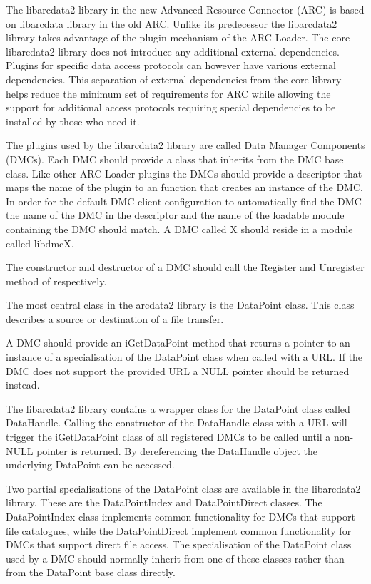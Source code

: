 \documentclass{book}
\begin{document}
The libarcdata2 library in the new Advanced Resource Connector (ARC)
is based on libarcdata library in the old ARC. Unlike its predecessor
the libarcdata2 library takes advantage of the plugin mechanism of the
ARC Loader. The core libarcdata2 library does not introduce any
additional external dependencies. Plugins for specific data access
protocols can however have various external dependencies. This
separation of external dependencies from the core library helps reduce
the minimum set of requirements for ARC while allowing the support for
additional access protocols requiring special dependencies to be
installed by those who need it.

The plugins used by the libarcdata2 library are called Data Manager
Components (DMCs). Each DMC should provide a class that inherits from
the DMC base class. Like other ARC Loader plugins the DMCs should
provide a descriptor that maps the name of the plugin to an function
that creates an instance of the DMC. In order for the default DMC
client configuration to automatically find the DMC the name of the DMC
in the descriptor and the name of the loadable module containing the
DMC should match. A DMC called X should reside in a module called
libdmcX.

The constructor and destructor of a DMC should call the Register and
Unregister method of respectively.

The most central class in the arcdata2 library is the DataPoint
class. This class describes a source or destination of a file
transfer.

A DMC should provide an iGetDataPoint method that returns a pointer to
an instance of a specialisation of the DataPoint class when called
with a URL. If the DMC does not support the provided URL a NULL
pointer should be returned instead.

The libarcdata2 library contains a wrapper class for the DataPoint
class called DataHandle. Calling the constructor of the DataHandle
class with a URL will trigger the iGetDataPoint class of all
registered DMCs to be called until a non-NULL pointer is returned.
By dereferencing the DataHandle object the underlying DataPoint can be
accessed.

Two partial specialisations of the DataPoint class are available in
the libarcdata2 library. These are the DataPointIndex and
DataPointDirect classes. The DataPointIndex class implements common
functionality for DMCs that support file catalogues, while the
DataPointDirect implement common functionality for DMCs that support
direct file access. The specialisation of the DataPoint class used by
a DMC should normally inherit from one of these classes rather than
from the DataPoint base class directly.
\end{document}
